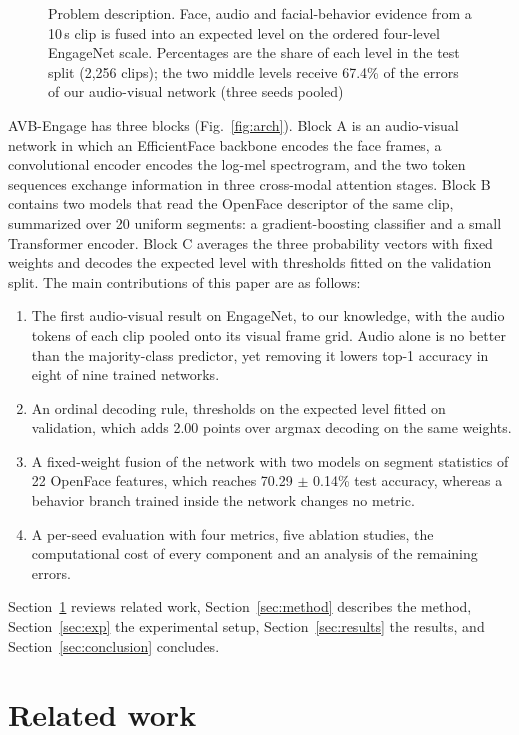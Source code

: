 \documentclass[pdflatex,iicol,sn-basic]{sn-jnl}
\newcommand{\ournet}{AVB-Engage}
\begin{document}
\begin{figure}[t]
\centering

\caption{Problem description. Face, audio and facial-behavior evidence from a 10\,s clip is fused into an expected level on the ordered four-level EngageNet scale. Percentages are the share of each level in the test split (2,256 clips); the two middle levels receive 67.4\% of the errors of our audio-visual network (three seeds pooled)}
\label{fig:concept}
\end{figure}

\ournet{} has three blocks (Fig.~\ref{fig:arch}). Block A is an audio-visual network in which an EfficientFace backbone \citep{zhao2021efficientface} encodes the face frames, a convolutional encoder encodes the log-mel spectrogram, and the two token sequences exchange information in three cross-modal attention stages. Block B contains two models that read the OpenFace descriptor of the same clip, summarized over 20 uniform segments: a gradient-boosting classifier and a small Transformer encoder. Block C averages the three probability vectors with fixed weights and decodes the expected level with thresholds fitted on the validation split. The main contributions of this paper are as follows:
\begin{enumerate}
\item The first audio-visual result on EngageNet, to our knowledge, with the audio tokens of each clip pooled onto its visual frame grid. Audio alone is no better than the majority-class predictor, yet removing it lowers top-1 accuracy in eight of nine trained networks.
\item An ordinal decoding rule, thresholds on the expected level fitted on validation, which adds 2.00 points over argmax decoding on the same weights.
\item A fixed-weight fusion of the network with two models on segment statistics of 22 OpenFace features, which reaches 70.29 $\pm$ 0.14\% test accuracy, whereas a behavior branch trained inside the network changes no metric.
\item A per-seed evaluation with four metrics, five ablation studies, the computational cost of every component and an analysis of the remaining errors.
\end{enumerate}
Section~\ref{sec:related} reviews related work, Section~\ref{sec:method} describes the method, Section~\ref{sec:exp} the experimental setup, Section~\ref{sec:results} the results, and Section~\ref{sec:conclusion} concludes.

\section{Related work}\label{sec:related}
\end{document}
